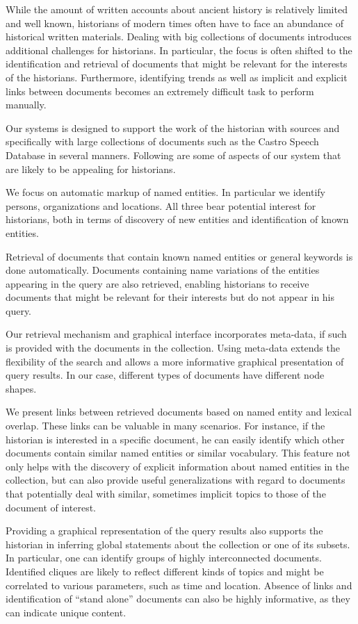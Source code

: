 While the amount of written accounts about ancient history is relatively limited and well known, historians of modern times often have to face an abundance of historical written materials. Dealing with big collections of documents introduces additional challenges for historians. In particular, the focus is often shifted to the identification and retrieval of documents that might be relevant for the interests of the historians. Furthermore, identifying trends as well as implicit and explicit links between documents becomes an extremely difficult task to perform manually.

Our systems is designed to support the work of the historian with sources and specifically with large collections of documents such as the Castro Speech Database in several manners. Following are some of aspects of our system that are likely to be appealing for historians.

We focus on automatic markup of named entities. In particular we identify persons, organizations and locations. All three bear potential interest for historians, both in terms of discovery of new entities and identification of known entities. 

Retrieval of documents that contain known named entities or general keywords is done automatically. Documents containing name variations of the entities appearing in the query are also retrieved, enabling historians to receive documents that might be relevant for their interests but do not appear in his query. 

Our retrieval mechanism and graphical interface incorporates meta-data, if such is provided with the documents in the collection. Using meta-data extends the flexibility of the search and allows a more informative graphical presentation of query results. In our case, different types of documents have different node shapes. 

We present links between retrieved documents based on named entity and lexical overlap. These links can be valuable in many scenarios. For instance, if the historian is interested in a specific document, he can easily identify which other documents contain similar named entities or similar vocabulary.  This feature not only helps with the discovery of explicit information about named entities in the collection, but can also provide useful generalizations with regard to documents that potentially deal with similar, sometimes implicit topics to those of the document of interest.   

Providing a graphical representation of the query results also supports the historian in inferring global statements about the collection or one of its subsets. In particular, one can identify groups of highly interconnected documents. Identified cliques are likely to reflect different kinds of topics and might be correlated to various parameters, such as time and location. Absence of links and identification of ``stand alone'' documents can also be highly informative, as they can indicate unique content. 

